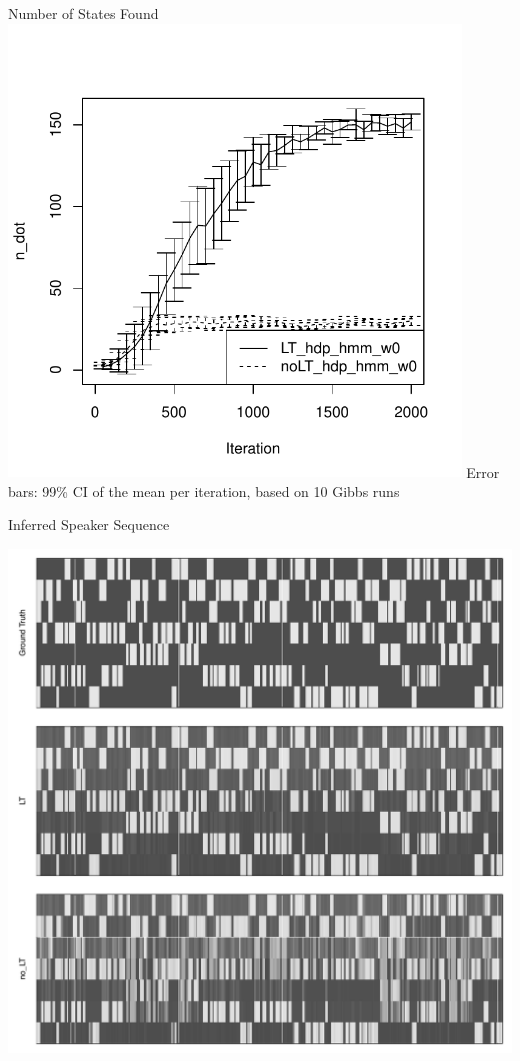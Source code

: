 \documentclass[11pt, mathserif, handout, table]{beamer}
\begin{document}
\begin{frame}{Number of States Found}
\vspace{-0.4in}
    \includegraphics[width=0.9\textwidth]{img/cocktail/n_dot.pdf}
    Error bars: 99\% CI of the mean per iteration, based on 10 Gibbs runs
\end{frame}

\begin{frame}{Inferred Speaker Sequence}
  \begin{center}
    \includegraphics[width=\textwidth,height=0.75\textwidth]{img/hdp-hmm-lt_grid.pdf}
  \end{center}
\end{frame}
\end{document}
